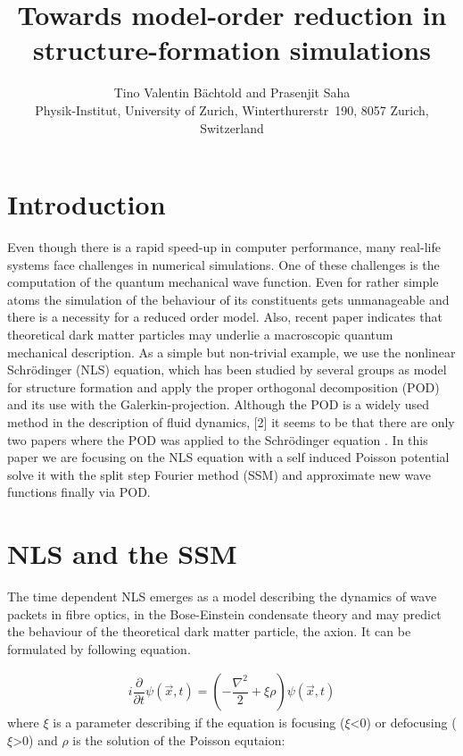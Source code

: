 \documentclass[usenatbib]{mn2e}
\title{Towards model-order reduction in structure-formation simulations}
\author[B\"achtold and Saha]{Tino Valentin B\"achtold and Prasenjit Saha \\
Physik-Institut, University of Zurich, Winterthurerstr~190, 8057 Zurich, Switzerland \\ }
\date{}
\begin{document}
\maketitle

\begin{abstract}
\end{abstract}

\begin{keywords}

\end{keywords}

\section{Introduction}
Even though there is a rapid speed-up in computer performance, many real-life systems face challenges in numerical simulations. One of these challenges is the computation of the quantum mechanical wave function. Even for rather simple atoms the simulation of the behaviour of its constituents gets unmanageable and there is a necessity for a reduced order model. Also, recent paper indicates that theoretical dark matter particles may underlie a macroscopic quantum mechanical description. 
As a simple but non-trivial example, we use the nonlinear
Schr\"odinger (NLS) equation, which has been studied by several groups as
model for structure formation\citep{1993ApJ...416L..71W,2014PhRvD..90b3517U} and apply the proper orthogonal decomposition (POD) and its use with the Galerkin-projection. 
Although the POD is a widely used method in the description of fluid dynamics, [2] it seems to be that there are only two papers where the POD was applied to the Schr\"odinger equation \citep{Karasoezen2015509}. In this paper we are focusing on the NLS equation with a self induced Poisson potential solve it with the split step Fourier method (SSM) and approximate new wave functions finally via POD. 
\section{NLS and the SSM}
The time dependent NLS emerges as a model describing the dynamics of wave packets in fibre optics, in the Bose-Einstein condensate theory and may predict the behaviour of the theoretical dark matter particle, the axion. It can be formulated by following equation.


\begin{equation} \label{eq1}
\begin{split}
i\dfrac {\partial } {\partial t}\psi( \overrightarrow{x},t) =( -\dfrac {\nabla ^{2}} {2}+ \xi \rho) \psi( \overrightarrow {x},t)
\end{split}
\end{equation}
where \(\xi\) is a parameter describing if the equation is focusing (\(\xi\)\textless  0) or defocusing (\(\xi\)\textgreater0) and \(\rho\) is the solution of the Poisson equtaion:
\end{document}

